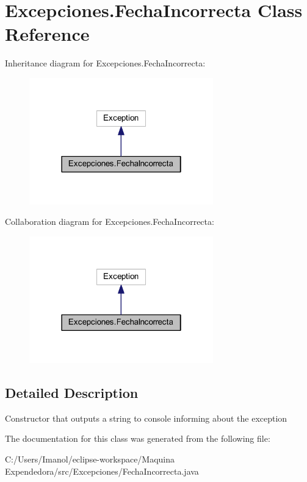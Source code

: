 \hypertarget{class_excepciones_1_1_fecha_incorrecta}{}\section{Excepciones.\+Fecha\+Incorrecta Class Reference}
\label{class_excepciones_1_1_fecha_incorrecta}


Inheritance diagram for Excepciones.\+Fecha\+Incorrecta\+:
\nopagebreak
\begin{figure}[H]
\begin{center}
\leavevmode
\includegraphics[width=226pt]{class_excepciones_1_1_fecha_incorrecta__inherit__graph}
\end{center}
\end{figure}


Collaboration diagram for Excepciones.\+Fecha\+Incorrecta\+:
\nopagebreak
\begin{figure}[H]
\begin{center}
\leavevmode
\includegraphics[width=226pt]{class_excepciones_1_1_fecha_incorrecta__coll__graph}
\end{center}
\end{figure}


\subsection{Detailed Description}
Constructor that outputs a string to console informing about the exception 

The documentation for this class was generated from the following file\+:\begin{DoxyCompactItemize}
\item 
C\+:/\+Users/\+Imanol/eclipse-\/workspace/\+Maquina Expendedora/src/\+Excepciones/Fecha\+Incorrecta.\+java\end{DoxyCompactItemize}
